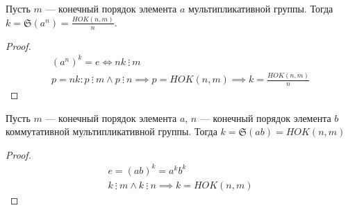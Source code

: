 \begin{theorem}
    Пусть $m$ --- конечный порядок элемента $a$ мультипликативной группы. Тогда $k = \mathfrak{S}(a^n)= \frac{HOK(n,m)}{n}$.
\end{theorem}
\begin{proof}
    \begin{equation*}
        \begin{gathered}
            (a^n)^k = e \iff nk\ \vdots \ m \\
            p = nk: p \ \vdots\ m \land p \ \vdots\ n \implies p = HOK(n, m) \implies k = \frac{HOK(n, m)}{n}
        \end{gathered}
    \end{equation*}
\end{proof}

\begin{theorem}
    Пусть $m$ --- конечный порядок элемента $a$, $n$ --- конечный порядок элемента $b$ коммутативной мультипликативной группы.
    Тогда $k = \mathfrak{S}(ab) = HOK(n, m)$
\end{theorem}
\begin{proof}
    \begin{equation*}
        \begin{gathered}
            e  = (ab)^k  = a^kb^k\\
            k\ \vdots \ m \land k\ \vdots \ n  \implies k = HOK(n, m)
        \end{gathered}
    \end{equation*}
\end{proof}

